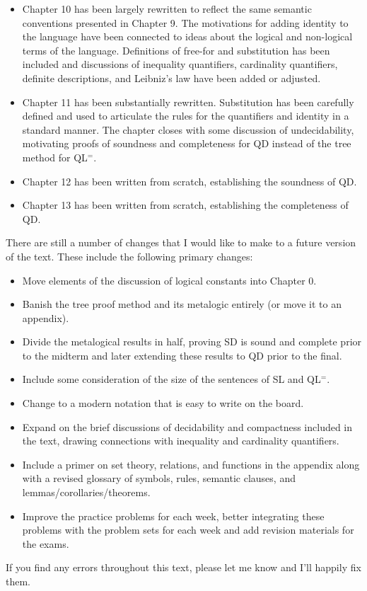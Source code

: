 \begin{itemize}
  \item Chapter 10 has been largely rewritten to reflect the same semantic conventions presented in Chapter 9. The motivations for adding identity to the language have been connected to ideas about the logical and non-logical terms of the language. Definitions of free-for and substitution has been included and discussions of inequality quantifiers, cardinality quantifiers, definite descriptions, and Leibniz's law have been added or adjusted.
  \item Chapter 11 has been substantially rewritten. Substitution has been carefully defined and used to articulate the rules for the quantifiers and identity in a standard manner. The chapter closes with some discussion of undecidability, motivating proofs of soundness and completeness for QD instead of the tree method for QL$^=$.
  \item Chapter 12 has been written from scratch, establishing the soundness of QD.
  \item Chapter 13 has been written from scratch, establishing the completeness of QD.
\end{itemize}

There are still a number of changes that I would like to make to a future version of the text.
These include the following primary changes:
  \begin{itemize}
    \item Move elements of the discussion of logical constants into Chapter 0.
    \item Banish the tree proof method and its metalogic entirely (or move it to an appendix).
    \item Divide the metalogical results in half, proving SD is sound and complete prior to the midterm and later extending these results to QD prior to the final.
    \item Include some consideration of the size of the sentences of SL and QL$^=$.
    \item Change to a modern notation that is easy to write on the board. %
    \item Expand on the brief discussions of decidability and compactness included in the text, drawing connections with inequality and cardinality quantifiers.
    \item Include a primer on set theory, relations, and functions in the appendix along with a revised glossary of symbols, rules, semantic clauses, and lemmas/corollaries/theorems.
    \item Improve the practice problems for each week, better integrating these problems with the problem sets for each week and add revision materials for the exams.
  \end{itemize}
If you find any errors throughout this text, please let me know and I'll happily fix them.

